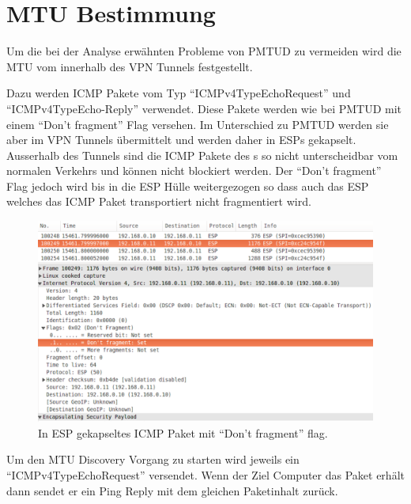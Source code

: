 \cleardoublepage
\section{MTU Bestimmung}
\label{sec:MTU Bestommung}

Um die bei der Analyse erwähnten Probleme von \acs{PMTUD} zu vermeiden wird die \acs{MTU} vom \tool{} innerhalb des \acs{VPN} Tunnels festgestellt.

Dazu werden \acs{ICMP} Pakete vom Typ \enquote{ICMPv4TypeEchoRequest} und \enquote{ICMPv4TypeEcho-Reply} verwendet. Diese Pakete werden wie bei \acs{PMTUD} mit einem \enquote{Don't fragment} Flag versehen. Im Unterschied zu \acs{PMTUD} werden sie aber im \acs{VPN} Tunnels übermittelt und werden daher in \acs{ESP}s gekapselt. Ausserhalb des Tunnels sind die ICMP Pakete des \tool{}s so nicht unterscheidbar vom normalen Verkehrs und können nicht blockiert werden.
Der \enquote{Don't fragment} Flag jedoch wird bis in die \acs{ESP} Hülle weitergezogen so dass auch das \acs{ESP} welches das \acs{ICMP} Paket transportiert nicht fragmentiert wird.

\begin{figure}[H]
    \begin{center}
        \includegraphics[trim=1 0 0 0,clip,width=\textwidth]{mainpart/implementation/img/ESP_DontFragment}
    \end{center}
    \caption{In ESP gekapseltes ICMP Paket mit \enquote{Don't fragment} flag.}
\end{figure}

Um den \acs{MTU} Discovery Vorgang zu starten wird jeweils ein \enquote{ICMPv4TypeEchoRequest} versendet. Wenn der Ziel Computer das Paket erhält dann sendet er ein Ping Reply mit dem gleichen Paketinhalt zurück.


